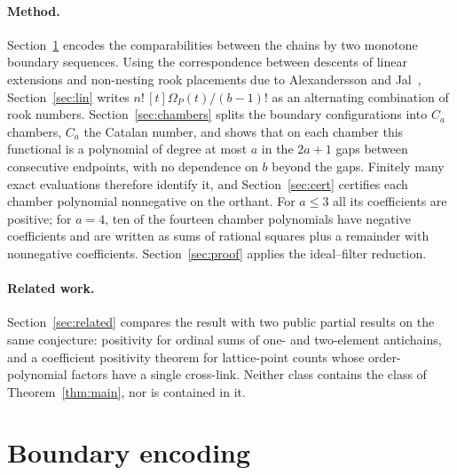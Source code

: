 \documentclass[11pt]{article}
\theoremstyle{definition}
\theoremstyle{remark}
\begin{document}
\paragraph{Method.} Section~\ref{sec:enc} encodes the comparabilities
between the chains by two monotone boundary sequences. Using the
correspondence between descents of linear extensions and non-nesting
rook placements due to Alexandersson and Jal~\cite{AJ}, Section~\ref{sec:lin}
writes $n!\,[t]\Omega_P(t)/(b-1)!$ as an alternating combination of rook
numbers. Section~\ref{sec:chambers} splits the boundary configurations
into $C_a$ chambers, $C_a$ the Catalan number, and shows that on each
chamber this functional is a polynomial of degree at most $a$ in the
$2a+1$ gaps between consecutive endpoints, with no dependence on $b$
beyond the gaps. Finitely many exact evaluations therefore identify it,
and Section~\ref{sec:cert} certifies each chamber polynomial nonnegative
on the orthant. For $a\le3$ all its coefficients are positive; for
$a=4$, ten of the fourteen chamber polynomials have negative
coefficients and are written as sums of rational squares plus a
remainder with nonnegative coefficients. Section~\ref{sec:proof} applies
the ideal--filter reduction.

\paragraph{Related work.} Section~\ref{sec:related} compares the result
with two public partial results on the same conjecture: positivity for
ordinal sums of one- and two-element antichains, and a coefficient
positivity theorem for lattice-point counts whose order-polynomial
factors have a single cross-link. Neither class contains the class of
Theorem~\ref{thm:main}, nor is contained in it.

\section{Boundary encoding}\label{sec:enc}
\end{document}
